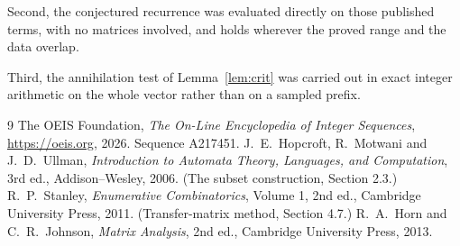 \documentclass[11pt,a4paper]{article}
\theoremstyle{plain}
\theoremstyle{definition}
\begin{document}
Second, the conjectured recurrence was evaluated directly on those published terms, with no
matrices involved, and holds wherever the proved range and the data overlap.

Third, the annihilation test of Lemma~\ref{lem:crit} was carried out in exact integer
arithmetic on the whole vector rather than on a sampled prefix.

\begin{thebibliography}{9}
 The OEIS Foundation, \emph{The On-Line Encyclopedia of Integer
Sequences}, \url{https://oeis.org}, 2026. Sequence A217451.
 J.~E.~Hopcroft, R.~Motwani and J.~D.~Ullman, \emph{Introduction to Automata
Theory, Languages, and Computation}, 3rd ed., Addison--Wesley, 2006. (The subset
construction, Section 2.3.)
 R.~P.~Stanley, \emph{Enumerative Combinatorics}, Volume 1, 2nd ed.,
Cambridge University Press, 2011. (Transfer-matrix method, Section 4.7.)
 R.~A.~Horn and C.~R.~Johnson, \emph{Matrix Analysis}, 2nd ed., Cambridge
University Press, 2013.
\end{thebibliography}
\end{document}
